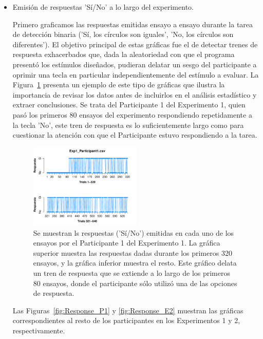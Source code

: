 \begin{itemize}
\item Emisión de respuestas 'Sí/No' a lo largo del experimento.

Primero graficamos las respuestas emitidas ensayo a ensayo durante la tarea de detección binaria ('Sí, los círculos son iguales', 'No, los círculos son diferentes'). El objetivo principal de estas gráficas fue el de detectar trenes de respuesta exhacerbados que, dada la aleatoriedad con que el programa presentó los estímulos diseñados, pudieran delatar un sesgo del participante a oprimir una tecla en particular independientemente del estímulo a evaluar. La Figura~\ref{fig:Resp_E1_P1} presenta un ejemplo de este tipo de gráficas que ilustra la importancia de revisar los datos antes de incluirlos en el análisis estadístico y extraer conclusiones. Se trata del Participante 1 del Experimento 1, quien pasó los primeros 80 ensayos del experimento respondiendo repetidamente a la tecla 'No', este tren de respuesta es lo suficientemente largo como para cuestionar la atención con que el Participante estuvo respondiendo a la tarea. 

\begin{figure}[th]
\centering
\includegraphics[width=0.50\textwidth]{Figures/Response_Exp1_P1} 
\caption[Respuesta emitida por ensayo; ejemplo de participante sesgado]{Se muestran ls respuestas ('Sí/No') emitidas en cada uno de los ensayos por el Participante 1 del Experimento 1. La gráfica superior muestra las respuestas dadas durante los primeros 320 ensayos, y la gráfica inferior muestra el resto. Este gráfico delata un tren de respuesta que se extiende a lo largo de los primeros 80 ensayos, donde el participante sólo utilizó una de las opciones de respuesta.}
\label{fig:Resp_E1_P1}
\end{figure}

Las Figuras~\ref{fig:Response_P1} y \ref{fig:Response_E2} muestran las gráficas correspondientes al resto de los participantes en los Experimentos 1 y 2, respectivamente.\\


\end{itemize}
